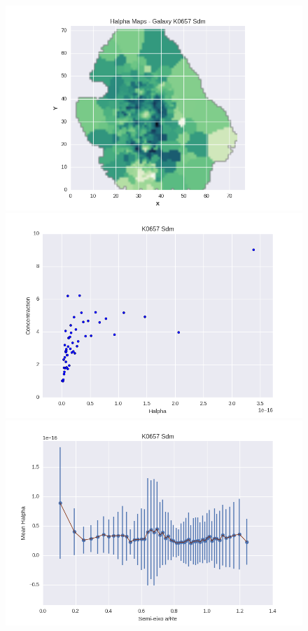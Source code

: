 \begin{figure}[!ht]
\begin{center}
\setcaptionmargin{1cm}
\includegraphics[width=0.3 \columnwidth,angle=0]{fig/galK0657.png}
\includegraphics[width=0.3 \columnwidth,angle=0]{fig/gal_K0657_concentration_Halpha.png}
\includegraphics[width=0.3 \columnwidth,angle=0]{fig/gal_K0657_perfis_elip.png}
\end{center}
\end{figure}
